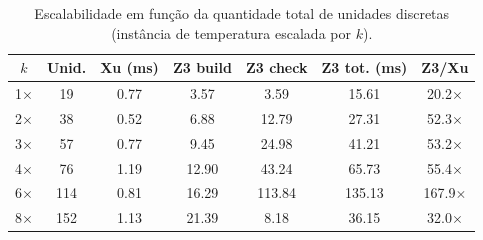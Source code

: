 \begin{table}[t]
\centering
\caption{Escalabilidade em fun\c{c}\~ao da quantidade total de unidades discretas (inst\^ancia de temperatura escalada por $k$).}
\label{tab:escalabilidade_unidades}
\scriptsize
\begin{tabular}{ccccccc}
\hline
\textbf{$k$} & \textbf{Unid.} & \textbf{Xu (ms)} & \textbf{Z3 build} & \textbf{Z3 check} & \textbf{Z3 tot. (ms)} & \textbf{Z3/Xu} \\
\hline
1$\times$ & 19 & 0.77 & 3.57 & 3.59 & 15.61 & 20.2$\times$ \\
2$\times$ & 38 & 0.52 & 6.88 & 12.79 & 27.31 & 52.3$\times$ \\
3$\times$ & 57 & 0.77 & 9.45 & 24.98 & 41.21 & 53.2$\times$ \\
4$\times$ & 76 & 1.19 & 12.90 & 43.24 & 65.73 & 55.4$\times$ \\
6$\times$ & 114 & 0.81 & 16.29 & 113.84 & 135.13 & 167.9$\times$ \\
8$\times$ & 152 & 1.13 & 21.39 & 8.18 & 36.15 & 32.0$\times$ \\
\hline
\end{tabular}
\end{table}
